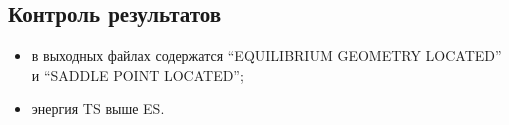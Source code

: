 \subsection{Контроль результатов}
\begin{itemize}
    \item в выходных файлах содержатся “EQUILIBRIUM GEOMETRY LOCATED” и “SADDLE POINT LOCATED”;
    \item энергия TS выше ES.
\end{itemize}{}